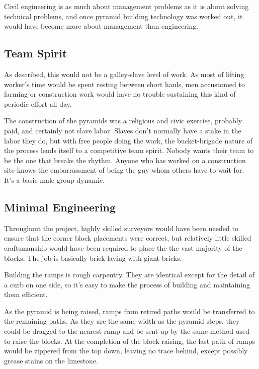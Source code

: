 \documentclass[letterpaper,11pt]{article}
\begin{document}
Civil engineering is as much about management problems as it is about solving technical problems, and once pyramid building technology was worked out, 
it would have become more about management than engineering. 


\subsection{Team Spirit}

As described, this would not be a galley-slave level of work. As most of lifting worker's time would be spent resting between short hauls, 
men accustomed to farming or construction work would have no trouble sustaining this kind of periodic effort all day.

The construction of the pyramids was a religious and civic exercise, probably paid, and certainly not slave labor. 
Slaves don't normally have a stake in the labor they do, but with free people doing the work, the bucket-brigade nature of 
the process lends itself to a competitive team spirit. 
Nobody wants their team to be the one that breaks the rhythm. 
Anyone who has worked on a construction site knows the embarrassment of being the guy whom others have to wait for.  
It's a basic male group dynamic.


\subsection{Minimal Engineering}

Throughout the project, highly skilled surveyors would have been needed to ensure that the corner block placements 
were correct, but relatively little skilled craftsmanship would have been required to place the the vast majority of the blocks.
The job is basically brick-laying with giant bricks.


Building the ramps is rough carpentry. 
They are identical except for the detail of a curb on one side, so it's easy to 
make the process of building and maintaining them efficient.  

As the pyramid is being raised, ramps from retired paths would be transferred to the remaining paths. 
As they are the same width as the pyramid steps, they could be dragged to the nearest ramp and be sent up by the same
method used to raise the blocks.
At the completion of the block raising, the last path of ramps would be zippered from the top down, leaving no trace behind,
except possibly grease stains on the limestone.
\end{document}

